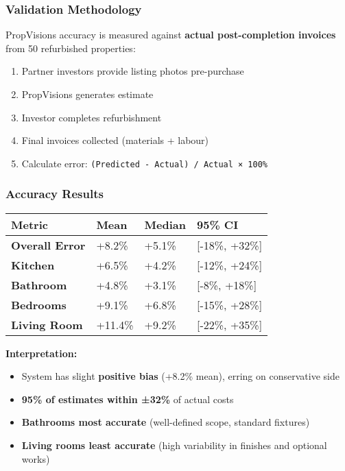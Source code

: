 \documentclass[11pt,a4paper]{article}
\begin{document}
\subsubsection{Validation Methodology}

PropVisions accuracy is measured against \textbf{actual post-completion invoices} from 50 refurbished properties:

\begin{enumerate}
  \item Partner investors provide listing photos pre-purchase
  \item PropVisions generates estimate
  \item Investor completes refurbishment
  \item Final invoices collected (materials + labour)
  \item Calculate error: \texttt{(Predicted - Actual) / Actual × 100\%}
\end{enumerate}

\subsubsection{Accuracy Results}

\begin{longtable}{@{}p{4cm}p{3cm}p{3cm}p{4cm}@{}}
\toprule
\textbf{Metric} & \textbf{Mean} & \textbf{Median} & \textbf{95\% CI} \\
\midrule
\textbf{Overall Error} & +8.2\% & +5.1\% & [-18\%, +32\%] \\
\textbf{Kitchen} & +6.5\% & +4.2\% & [-12\%, +24\%] \\
\textbf{Bathroom} & +4.8\% & +3.1\% & [-8\%, +18\%] \\
\textbf{Bedrooms} & +9.1\% & +6.8\% & [-15\%, +28\%] \\
\textbf{Living Room} & +11.4\% & +9.2\% & [-22\%, +35\%] \\
\bottomrule
\end{longtable}

\textbf{Interpretation:}
\begin{itemize}
  \item System has slight \textbf{positive bias} (+8.2\% mean), erring on conservative side
  \item \textbf{95\% of estimates within ±32\%} of actual costs
  \item \textbf{Bathrooms most accurate} (well-defined scope, standard fixtures)
  \item \textbf{Living rooms least accurate} (high variability in finishes and optional works)
\end{itemize}
\end{document}
